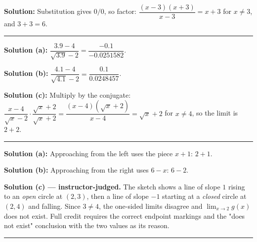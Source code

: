 \documentclass[12pt]{article}
\begin{document}




\textbf{Solution:} \quad Substitution gives $0/0$, so factor:
$\dfrac{(x-3)(x+3)}{x-3} = x + 3$ for $x \ne 3$, and $3 + 3 = 6$. 

\vspace{0.15cm}\noindent\rule{\linewidth}{0.2pt}\vspace{0.15cm}


\textbf{Solution (a):} \quad $\dfrac{3.9 - 4}{\sqrt{3.9} - 2} = \dfrac{-0.1}{-0.0251582}$.

\textbf{Solution (b):} \quad $\dfrac{4.1 - 4}{\sqrt{4.1} - 2} = \dfrac{0.1}{0.0248457}$.

\textbf{Solution (c):} \quad Multiply by the conjugate:
$\dfrac{x-4}{\sqrt{x}-2}\cdot\dfrac{\sqrt{x}+2}{\sqrt{x}+2} = \dfrac{(x-4)(\sqrt{x}+2)}{x-4}
= \sqrt{x} + 2$ for $x \ne 4$, so the limit is $2 + 2$. 

\vspace{0.15cm}\noindent\rule{\linewidth}{0.2pt}\vspace{0.15cm}


\textbf{Solution (a):} \quad Approaching from the left uses the piece $x + 1$: $2 + 1$.

\textbf{Solution (b):} \quad Approaching from the right uses $6 - x$: $6 - 2$. 

\textbf{Solution (c) --- instructor-judged.} \quad The sketch shows a line of slope $1$ rising
to an \emph{open} circle at $(2,3)$, then a line of slope $-1$ starting at a \emph{closed}
circle at $(2,4)$ and falling. Since $3 \ne 4$, the one-sided limits disagree and
$\lim_{x\to2} g(x)$ does not exist. Full credit requires the correct endpoint markings and the
"does not exist" conclusion with the two values as its reason.

\vspace{0.15cm}\noindent\rule{\linewidth}{0.2pt}\vspace{0.15cm}
\end{document}
